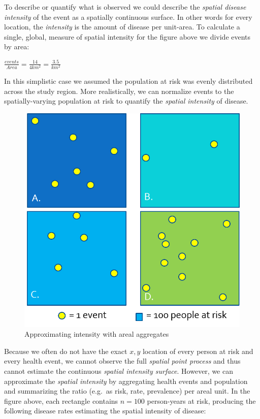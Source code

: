 \documentclass[
]{book}
\begin{document}
To describe or quantify what is observed we could describe the \emph{spatial disease intensity} of the event as a spatially continuous surface. In other words for every location, the \emph{intensity} is the amount of disease per unit-area. To calculate a single, global, measure of spatial intensity for the figure above we divide events by area:

\(\frac{events}{Area}=\frac{14}{4km^{2}}=\frac{3.5}{km^{2}}\)

In this simplistic case we assumed the population at risk was evenly distributed across the study region. More realistically, we can normalize events to the spatially-varying population at risk to quantify the \emph{spatial intensity} of disease.

\begin{figure}
\centering
\includegraphics{images/point-process-2.png}
\caption{\label{fig:unnamed-chunk-5}Approximating intensity with areal aggregates}
\end{figure}

Because we often do not have the exact \(x,y\) location of every person at risk and every health event, we cannot observe the full \emph{spatial point process} and thus cannot estimate the continuous \emph{spatial intensity surface}. However, we can approximate the \emph{spatial intensity} by aggregating health events and population and summarizing the ratio (e.g.~as risk, rate, prevalence) per areal unit. In the figure above, each rectangle contains \(n=100\) person-years at risk, producing the following disease rates estimating the spatial intensity of disease:
\end{document}
